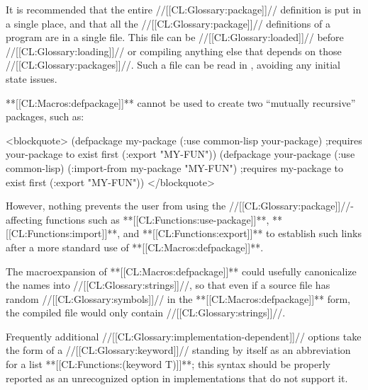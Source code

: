 It is recommended that the entire //[[CL:Glossary:package]]// definition is put in a single place, and that all the //[[CL:Glossary:package]]// definitions of a program are in a single file. This file can be //[[CL:Glossary:loaded]]// before //[[CL:Glossary:loading]]// or compiling anything else that depends on those //[[CL:Glossary:packages]]//. Such a file can be read in , avoiding any initial state issues.

**[[CL:Macros:defpackage]]** cannot be used to create two ``mutually recursive'' packages, such as:

<blockquote> (defpackage my-package (:use common-lisp your-package) ;requires your-package to exist first (:export "MY-FUN")) (defpackage your-package (:use common-lisp) (:import-from my-package "MY-FUN") ;requires my-package to exist first (:export "MY-FUN")) </blockquote>

However, nothing prevents the user from using the //[[CL:Glossary:package]]//-affecting functions such as **[[CL:Functions:use-package]]**, **[[CL:Functions:import]]**, and **[[CL:Functions:export]]** to establish such links after a more standard use of **[[CL:Macros:defpackage]]**.

The macroexpansion of **[[CL:Macros:defpackage]]** could usefully canonicalize the names into //[[CL:Glossary:strings]]//, so that even if a source file has random //[[CL:Glossary:symbols]]// in the **[[CL:Macros:defpackage]]** form, the compiled file would only contain //[[CL:Glossary:strings]]//.

Frequently additional //[[CL:Glossary:implementation-dependent]]// options take the form of a //[[CL:Glossary:keyword]]// standing by itself as an abbreviation for a list **[[CL:Functions:(keyword T)]]**; this syntax should be properly reported as an unrecognized option in implementations that do not support it.


     

